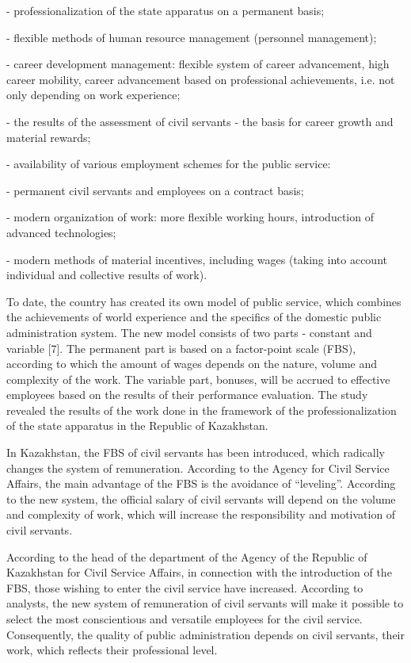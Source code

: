 \begin{multicols}{2}
- professionalization of the state apparatus on a permanent basis;

- flexible methods of human resource management (personnel management);

- career development management: flexible system of career advancement,
high career mobility, career advancement based on professional
achievements, i.e. not only depending on work experience;

- the results of the assessment of civil servants - the basis for career
growth and material rewards;

- availability of various employment schemes for the public service:

- permanent civil servants and employees on a contract basis;

- modern organization of work: more flexible working hours, introduction
of advanced technologies;

- modern methods of material incentives, including wages (taking into
account individual and collective results of work).

To date, the country has created its own model of public service, which
combines the achievements of world experience and the specifics of the
domestic public administration system. The new model consists of two
parts - constant and variable {[}7{]}. The permanent part is based on a
factor-point scale (FBS), according to which the amount of wages depends
on the nature, volume and complexity of the work. The variable part,
bonuses, will be accrued to effective employees based on the results of
their performance evaluation. The study revealed the results of the work
done in the framework of the professionalization of the state apparatus
in the Republic of Kazakhstan.

In Kazakhstan, the FBS of civil servants has been introduced, which
radically changes the system of remuneration. According to the Agency
for Civil Service Affairs, the main advantage of the FBS is the
avoidance of ``leveling''. According to the new system, the official
salary of civil servants will depend on the volume and complexity of
work, which will increase the responsibility and motivation of civil
servants.

According to the head of the department of the Agency of the Republic of
Kazakhstan for Civil Service Affairs, in connection with the
introduction of the FBS, those wishing to enter the civil service have
increased. According to analysts, the new system of remuneration of
civil servants will make it possible to select the most conscientious
and versatile employees for the civil service. Consequently, the quality
of public administration depends on civil servants, their work, which
reflects their professional level.


\end{multicols}
